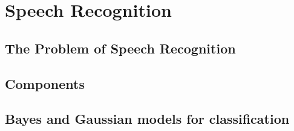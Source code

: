 \chapter{Speech Recognition}
\label{chap:Speech Recognition}

\section{The Problem of Speech Recognition}
\label{sec:The Problem of Speech Recognition}

\section{Components}
\label{sec:Components}

\section{\Naive Bayes and Gaussian models for classification}
\label{sec:Gaussian Classifiers and Distance Measures}

